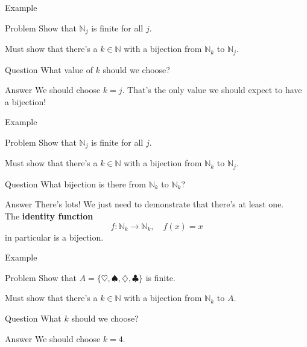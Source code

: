 \documentclass{beamer}
\begin{document}
\begin{frame}{Example}
\begin{block}{Problem}
Show that $\mathbb N_j$ is finite for all $j$.
\end{block}
\pause
Must show that there's a $k\in \mathbb N$ with a bijection from $\mathbb N_k$ to $\mathbb N_j$.\\
\pause
\begin{block}{Question}
What value of $k$ should we choose?
\end{block}
\pause
\begin{block}{Answer}
We should choose $k=j$.  That's the only value we should expect to have a bijection!
\end{block}
\end{frame}

\begin{frame}{Example}
\begin{block}{Problem}
Show that $\mathbb N_j$ is finite for all $j$.
\end{block}
Must show that there's a $k\in \mathbb N$ with a bijection from $\mathbb N_k$ to $\mathbb N_j$.\\
\begin{block}{Question}
What bijection is there from $\mathbb N_k$ to $\mathbb N_k$?
\end{block}
\pause
\begin{block}{Answer}
There's lots!  We just need to demonstrate that there's at least one.\\
\pause
The \textbf{identity function}
$$f:\mathbb N_k\rightarrow\mathbb N_k,\quad f(x) = x$$
in particular is a bijection.
\end{block}
\end{frame}

\begin{frame}{Example}
\begin{block}{Problem}
Show that $A = \{\heartsuit,\spadesuit,\diamondsuit,\clubsuit\}$ is finite.
\end{block}
Must show that there's a $k\in \mathbb N$ with a bijection from $\mathbb N_k$ to $A$.\\
\begin{block}{Question}
What $k$ should we choose?
\end{block}
\pause
\begin{block}{Answer}
We should choose $k=4$.
\end{block}
\end{frame}
\end{document}
